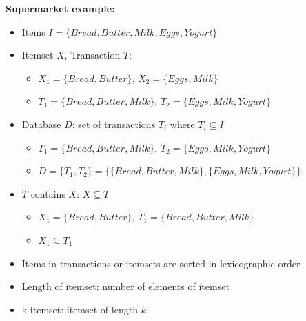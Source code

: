 \documentclass{article}
\begin{document}
\textbf{Supermarket example:}
\begin{itemize}
  \item Items $I = \{Bread, Butter, Milk, Eggs, Yogurt\}$ 
  \item Itemset $X$, Transaction $T$: 
    \begin{itemize}
      \item $X_1 = \{Bread, Butter\}$, $X_2 = \{Eggs, Milk\}$
      \item $T_1 = \{Bread, Butter, Milk\}$, $T_2 = \{Eggs, Milk, Yogurt\}$
    \end{itemize}
  \item Database $D$: set of transactions $T_i$ where $T_i \subseteq I$
    \begin{itemize}
      \item $T_1 = \{Bread, Butter, Milk\}$, $T_2 = \{Eggs, Milk, Yogurt\}$
      \item $D = \{T_1, T_2\} = \{\{Bread, Butter, Milk\}, \{Eggs, Milk, Yogurt\}\}$
    \end{itemize}
  \item $T$ contains $X$: $X \subseteq T$
    \begin{itemize}
      \item $X_1 = \{Bread, Butter\}$, $T_1 = \{Bread, Butter, Milk\}$
      \item $X_1 \subseteq T_1$
    \end{itemize}
  \item Items in transactions or itemsets are sorted in lexicographic order
  \item Length of itemset: number of elements of itemset
  \item k-itemset: itemset of length $k$
\end{itemize}
\end{document}
